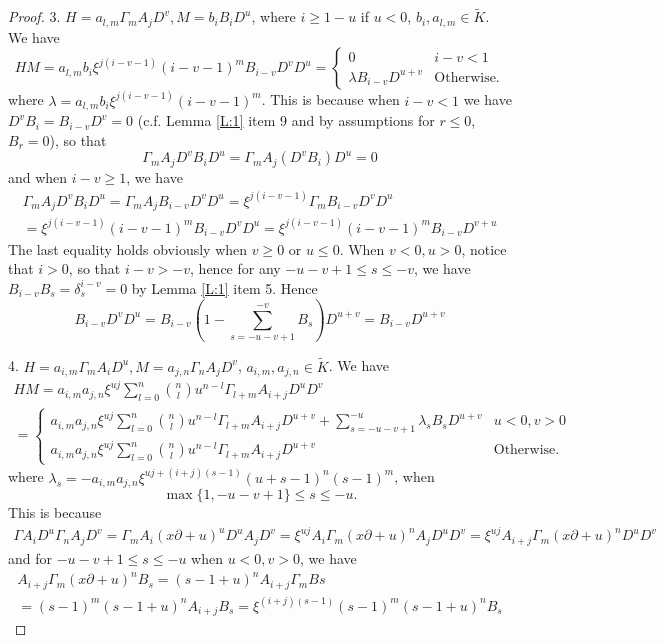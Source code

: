 \documentclass[11pt]{article}
\theoremstyle{definition}
\theoremstyle{plain}
\numberwithin{equation}{section}
\begin{document}
\begin{proof}
		3. $H=a_{l,m}\Gamma_m A_jD^v, M=b_iB_iD^u$, where $i\ge 1-u$ if $u<0$, $b_i, a_{l,m}\in \tilde{K}$. We have
		\begin{equation}
		\label{E:AB}
		HM= a_{l,m} b_i \xi^{j(i-v-1)}(i-v-1)^m B_{i-v}D^vD^u= \begin{cases}
			0 & i-v< 1
		\\ \lambda B_{i-v}D^{u+v} &\text{Otherwise.}
		\end{cases}
		\end{equation}
where $\lambda =	a_{l,m} b_i \xi^{j(i-v-1)}(i-v-1)^m$. This is because when $i-v< 1$ we have $D^vB_i=B_{i-v}D^v=0$ (c.f. Lemma \ref{L:1} item 9 and by assumptions for $r\leq 0$, $B_r=0$), so that 
$$
\Gamma_m A_jD^vB_iD^u=\Gamma_m A_j(D^vB_i)D^u=0
$$
and when $i-v\ge 1$, we have 
\begin{multline*}
	\Gamma_m A_jD^vB_iD^u=\Gamma_mA_jB_{i-v}D^vD^u=\xi^{j(i-v-1)}\Gamma_mB_{i-v}D^vD^u
	\\=\xi^{j(i-v-1)}(i-v-1)^mB_{i-v}D^vD^u=\xi^{j(i-v-1)}(i-v-1)^mB_{i-v}D^{v+u}
\end{multline*}
The last equality holds obviously when $v\ge 0$ or $u\leq 0$. When $v<0,u>0$, notice that $i>0$, so that $i-v>-v$, hence for any $-u-v+1\leq s\leq -v$, we have $B_{i-v}B_s=\delta_{s}^{i-v}=0$ by Lemma \ref{L:1} item 5. Hence
$$
B_{i-v}D^vD^u=B_{i-v}(1-\sum_{s=-u-v+1}^{-v}B_s)D^{u+v}=B_{i-v}D^{u+v}
$$
		
		4. $H=a_{i,m}\Gamma_mA_iD^u, M=a_{j,n}\Gamma_nA_jD^v$, $a_{i,m}, a_{j,n}\in \tilde{K}$.  We have 
		\begin{multline}
		\label{E:AA}
		HM= a_{i,m} a_{j,n} \xi^{uj} \sum_{l=0}^{n}\binom{n}{l}u^{n-l}\Gamma_{l+m}A_{i+j}D^uD^v
		\\=\begin{cases}
		a_{i,m} a_{j,n} \xi^{uj} \sum_{l=0}^{n}\binom{n}{l}u^{n-l}\Gamma_{l+m}A_{i+j}D^{u+v}+\sum_{s=-u-v+1}^{-u}\lambda_sB_sD^{u+v} &u<0,v>0
		\\ a_{i,m} a_{j,n} \xi^{uj}\sum_{l=0}^{n}\binom{n}{l}u^{n-l}\Gamma_{l+m}A_{i+j}D^{u+v} &\text{Otherwise.}
		\end{cases}
		\end{multline}
		where $\lambda_s=-a_{i,m}a_{j,n}\xi^{u j+(i+j)(s-1)}(u+s-1)^n(s-1)^m$, when $$\max\{1,-u-v+1 \}\leq s\leq -u.$$ 
		This is because
		\begin{multline*}
			\Gamma A_i D^u\Gamma_nA_jD^v=\Gamma_mA_i(x\partial+u)^uD^uA_jD^v=\xi^{uj}A_i\Gamma_m(x\partial+u)^nA_jD^uD^v
			=\xi^{uj}A_{i+j}\Gamma_m(x\partial+u)^nD^uD^v
		\end{multline*}
		and for $-u-v+1\leq s\leq -u$ when $u<0,v>0$, we have 
		\begin{multline*}
		A_{i+j}\Gamma_m(x\partial+u)^nB_s=(s-1+u)^nA_{i+j}\Gamma_mBs
		\\=(s-1)^m(s-1+u)^nA_{i+j}B_s=\xi^{(i+j)(s-1)}(s-1)^m(s-1+u)^nB_s
		\end{multline*}
	

\end{proof}
\end{document}

